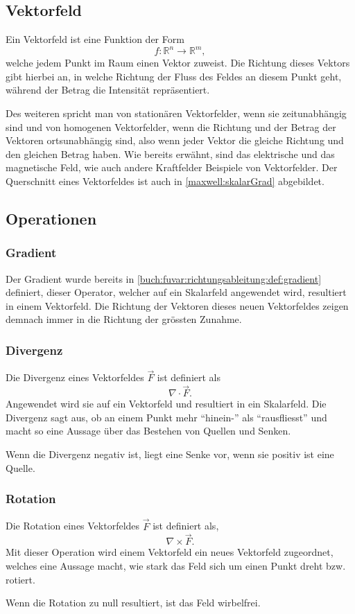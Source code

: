 \subsection{Vektorfeld\label{maxwell:vektorfeld}}

Ein Vektorfeld ist eine Funktion der Form \[ f: \mathbb{R}^n \rightarrow \mathbb{R}^m, \] welche jedem Punkt im Raum einen Vektor zuweist. 
Die Richtung dieses Vektors gibt hierbei an, in welche Richtung der Fluss des Feldes an diesem Punkt geht, während der Betrag die Intensität repräsentiert.


Des weiteren spricht man von stationären Vektorfelder, wenn sie zeitunabhängig sind und von homogenen Vektorfelder, wenn die Richtung und der Betrag der Vektoren ortsunabhängig sind, also wenn jeder Vektor die gleiche Richtung und den gleichen Betrag haben. 
Wie bereits erwähnt, sind das elektrische und das magnetische Feld, wie auch andere Kraftfelder Beispiele von Vektorfelder.
Der Querschnitt eines Vektorfeldes ist auch in \ref{maxwell:skalarGrad} abgebildet.

\subsection{Operationen}

\subsubsection*{Gradient}

Der Gradient wurde bereits in \ref{buch:fuvar:richtungsableitung:def:gradient} definiert, dieser Operator, welcher auf ein Skalarfeld angewendet wird, resultiert in einem Vektorfeld. 
Die Richtung der Vektoren dieses neuen Vektorfeldes zeigen demnach immer in die Richtung der grössten Zunahme.

\subsubsection*{Divergenz}
Die Divergenz eines Vektorfeldes $\vec{F}$ ist definiert als 
\[ \nabla\cdot\vec{F}. \]
Angewendet wird sie auf ein Vektorfeld und resultiert in ein Skalarfeld.
Die Divergenz sagt aus, ob an einem Punkt mehr ``hinein-'' als ``rausfliesst'' und macht so eine Aussage über das Bestehen von Quellen und Senken.

Wenn die Divergenz negativ ist, liegt eine Senke vor, wenn sie positiv ist eine Quelle. 

\subsubsection*{Rotation}
Die Rotation eines Vektorfeldes $\vec{F}$ ist definiert als,
\[ \nabla\times\vec{F}. \]
Mit dieser Operation wird einem Vektorfeld ein neues Vektorfeld zugeordnet, welches eine Aussage macht, wie stark das Feld sich um einen Punkt dreht bzw. rotiert.

Wenn die Rotation zu null resultiert, ist das Feld wirbelfrei.
